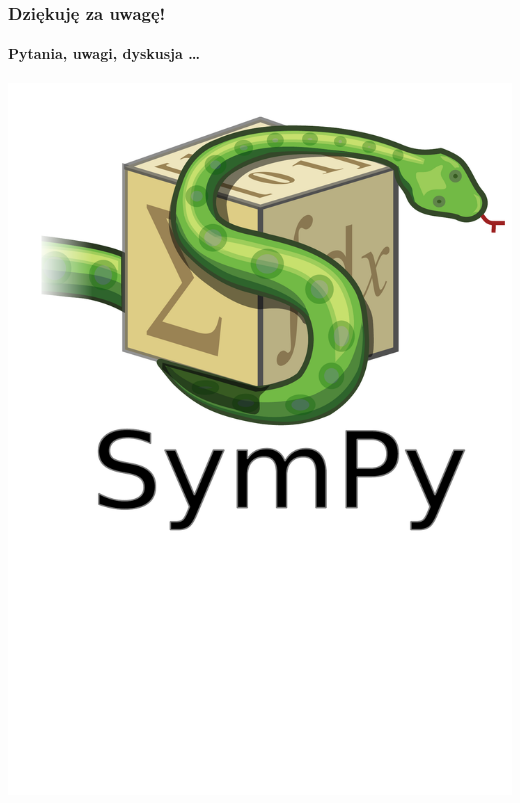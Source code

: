 \documentclass{beamer}
\begin{document}
\begin{frame}
    \frametitle{Dziękuję za uwagę!}
    \framesubtitle{Pytania, uwagi, dyskusja \ldots}

    \begin{center}
        \includegraphics[scale=0.2]{images/sympy-logo.pdf}
    \end{center}
\end{frame}
\end{document}
